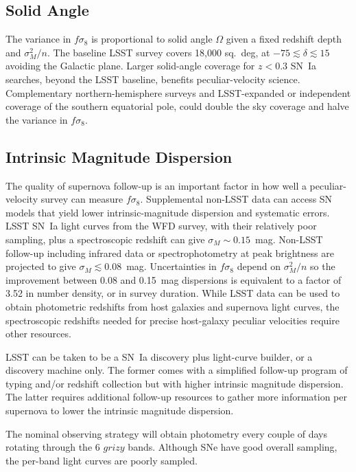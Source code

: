 \documentclass{aastex62}   	%
\begin{document}
\subsection{Solid Angle}

The variance in $f\sigma_8$ is proportional to solid angle $\Omega$ given a fixed redshift depth and  $\sigma^2_M/n$.  The baseline
LSST survey covers 18,000 sq.~deg, at $-75 \lesssim \delta \lesssim15$ avoiding the Galactic plane.  Larger solid-angle coverage for $z<0.3$ SN~Ia searches, beyond
the LSST baseline, benefits peculiar-velocity science.  Complementary northern-hemisphere surveys and LSST-expanded or independent
coverage of the southern equatorial pole, could double
the sky coverage and halve the variance in $f\sigma_8$.

\subsection{Intrinsic Magnitude Dispersion}
The quality of supernova follow-up is an important factor in how well a peculiar-velocity survey can measure $f\sigma_8$.
Supplemental non-LSST data can access SN models that yield lower intrinsic-magnitude dispersion and systematic errors.
LSST SN~Ia light curves from the WFD survey, with their relatively poor sampling, plus a spectroscopic redshift
 can give $\sigma_M \sim 0.15$~mag.
 Non-LSST follow-up including infrared data \citep{2012MNRAS.425.1007B} or spectrophotometry at peak brightness
 \citep{2015ApJ...815...58F} are projected to give
$\sigma_M \lesssim 0.08$~mag.
Uncertainties in $f\sigma_8$ depend on $\sigma^2_M/n$ so the improvement between 0.08 and 0.15~mag dispersions is equivalent to a factor of 3.52
 in number density, or in survey duration. 
While LSST data can be used to obtain photometric redshifts from host galaxies and supernova light curves, the spectroscopic
redshifts needed for precise host-galaxy peculiar velocities require other resources.

LSST can be taken to be a SN~Ia discovery plus light-curve builder, or a discovery machine only.  The former comes with a simplified follow-up program of typing
and/or redshift collection but with higher intrinsic magnitude dispersion.  The latter requires additional follow-up resources to gather more information per supernova to
lower the intrinsic magnitude dispersion.

The nominal observing strategy will obtain photometry every couple of days rotating through the 6 $grizy$ bands.  Although SNe have good
overall sampling, the per-band light curves are poorly sampled.
\end{document}
